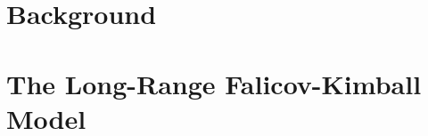 \documentclass[a4paper,12pt]{report}
\begin{document}
\hypertarget{chap:2-background}{\chapter{Background}}
\begin{refsection}




\printbibliography[heading=subbibintoc]
\end{refsection}

\hypertarget{chap:3-the-long-range-falicov-kimball-model}{\chapter{The Long-Range Falicov-Kimball Model}}
\end{document}

